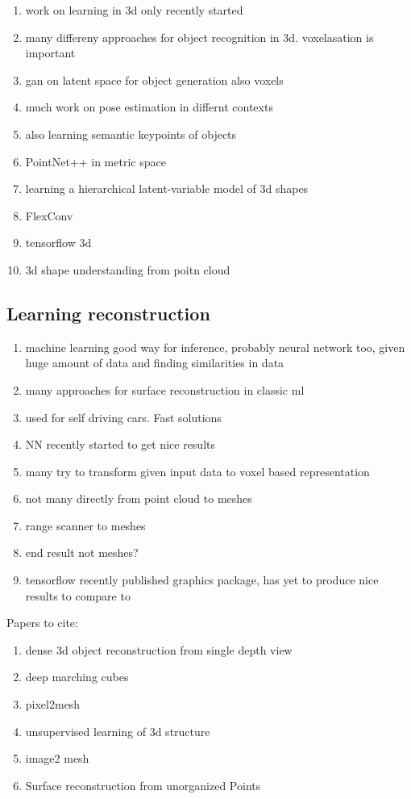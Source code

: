  \begin{enumerate}
  \item work on learning in 3d only recently started
  \item many differeny approaches for object recognition in 3d. voxelasation is important
  \item gan on latent space for object generation also voxels
  \item much work on pose estimation in differnt contexts
  \item also learning semantic keypoints of objects
  \item PointNet++ in metric space
  \item learning a hierarchical latent-variable model of 3d shapes
  \item FlexConv
  \item tensorflow 3d
  \item 3d shape understanding from poitn cloud
 \end{enumerate}

 \subsection{Learning reconstruction}
 \label{transform}

\begin{enumerate}
  \item machine learning good way for inference, probably neural network too, given huge amount of data and finding similarities in data
  \item many approaches for surface reconstruction in classic ml
  \item used for self driving cars. Fast solutions
  \item NN recently started to get nice results
  \item many try to transform given input data to voxel based representation
  \item not many directly from point cloud to meshes
  \item range scanner to meshes
  \item end result not meshes?
  \item tensorflow recently published graphics package, has yet to produce nice results to compare to
\end{enumerate}
Papers to cite:
\begin{enumerate}
  \item dense 3d object reconstruction from single depth view
  \item deep marching cubes
  \item pixel2mesh
  \item unsupervised learning of 3d structure
  \item image2 mesh
  \item Surface reconstruction from unorganized Points
\end{enumerate}
